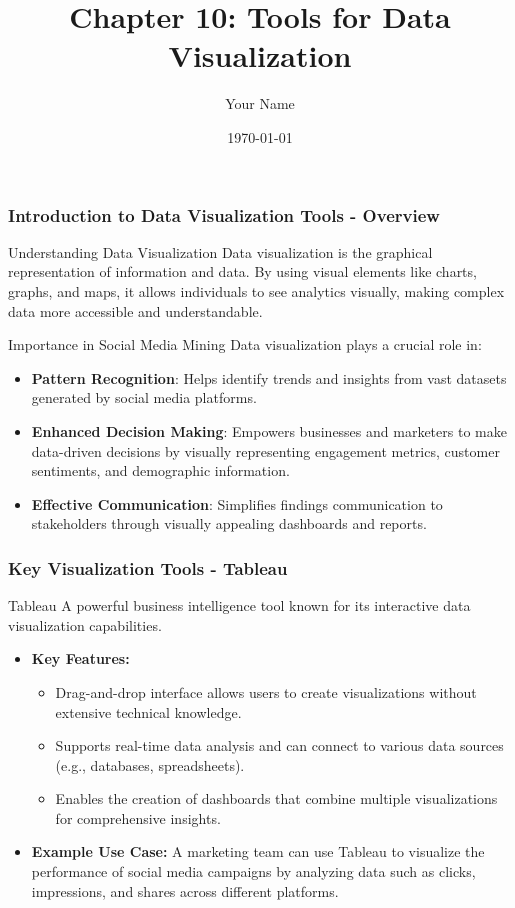 \documentclass{beamer}
\title{Chapter 10: Tools for Data Visualization}
\author{Your Name}
\institute{Your Institution}
\date{\today}
\begin{document}
\frame{\titlepage}

\begin{frame}[fragile]
    \frametitle{Introduction to Data Visualization Tools - Overview}
    \begin{block}{Understanding Data Visualization}
        Data visualization is the graphical representation of information and data. By using visual elements like charts, graphs, and maps, it allows individuals to see analytics visually, making complex data more accessible and understandable.
    \end{block}
    
    \begin{block}{Importance in Social Media Mining}
        Data visualization plays a crucial role in:
        \begin{itemize}
            \item \textbf{Pattern Recognition}: Helps identify trends and insights from vast datasets generated by social media platforms.
            \item \textbf{Enhanced Decision Making}: Empowers businesses and marketers to make data-driven decisions by visually representing engagement metrics, customer sentiments, and demographic information.
            \item \textbf{Effective Communication}: Simplifies findings communication to stakeholders through visually appealing dashboards and reports.
        \end{itemize}
    \end{block}
\end{frame}

\begin{frame}[fragile]
    \frametitle{Key Visualization Tools - Tableau}
    \begin{block}{Tableau}
        A powerful business intelligence tool known for its interactive data visualization capabilities.
        \begin{itemize}
            \item \textbf{Key Features:}
            \begin{itemize}
                \item Drag-and-drop interface allows users to create visualizations without extensive technical knowledge.
                \item Supports real-time data analysis and can connect to various data sources (e.g., databases, spreadsheets).
                \item Enables the creation of dashboards that combine multiple visualizations for comprehensive insights.
            \end{itemize}
            \item \textbf{Example Use Case:} 
            A marketing team can use Tableau to visualize the performance of social media campaigns by analyzing data such as clicks, impressions, and shares across different platforms.
        \end{itemize}
    \end{block}
\end{frame}
\end{document}
